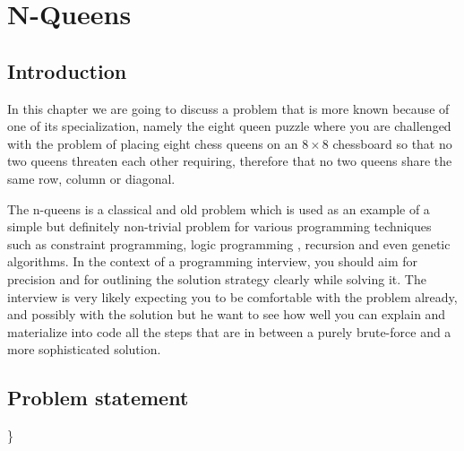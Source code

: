 %



\chapter{N-Queens}
\label{ch:nqueens}
\section*{Introduction}
In this chapter we are going to discuss a problem that is more known because of one of its
specialization, namely the eight queen puzzle where you are challenged with the problem of placing
eight chess queens on an $8 \times 8$ chessboard so that no two queens threaten each other requiring,
therefore that no two queens share the same row, column or diagonal.

The n-queens is a classical and old problem which is used as an example of a simple but definitely 
non-trivial problem for various programming techniques such as constraint programming, 
logic programming , recursion and even genetic algorithms.
In the context of a programming interview, you should aim for precision and for outlining the solution strategy
clearly while solving it. The interview is very likely expecting you to be comfortable with the problem already, and possibly with the solution
but he want to see how well you can explain and materialize into code all the steps that are in between a purely brute-force and a more sophisticated solution.



\section{Problem statement}
\begin{exercise}
\label{example:nqueens:exercice1}

	\begin{example}
		\label{example:nqueens:example1}
		\hfill \}
		
	\end{example}

	\begin{example}
		\label{example:nqueens:example2}
		\hfill \
		
	\end{example}

	\begin{example}
		\hfill \
	
	\label{ex:nqueens:example3}
	\end{example}

	\begin{example}
		\hfill \

	\label{ex:nqueens:example4}	
	\end{example}
\end{exercise}

